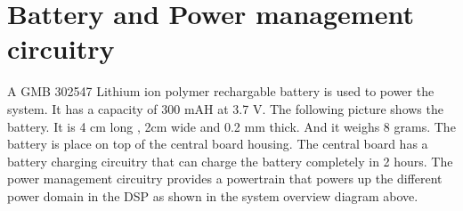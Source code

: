 \section{Battery and Power management circuitry}
 A GMB 302547 Lithium ion polymer rechargable battery is used to power the system. It has a capacity of 300 mAH at 3.7 V. The following picture shows the battery. It is 4 cm long , 2cm wide and 0.2 mm thick. And it weighs  8 grams. The battery is place on top of the central board housing. The central board has a battery charging circuitry that can charge the battery completely in 2 hours. The power management circuitry provides a powertrain that powers up the different power domain in the DSP  as shown in the system overview diagram above.             
